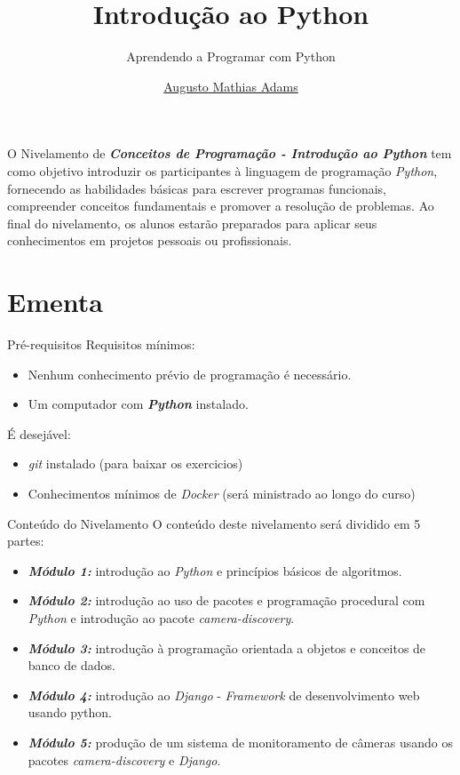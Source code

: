 \documentclass{beamer}
\title{Introdução ao Python}
\subtitle{Aprendendo a Programar com Python}
\author{\href{mailto:augusto.mathias@sesp.pr.gov.br}{Augusto Mathias Adams}}
\begin{document}
\maketitle
{}

\begin{frame}
\label{apresentacao}
O Nivelamento de \textbf{\textit{Conceitos de Programação - Introdução ao Python }}tem como objetivo introduzir os participantes à linguagem de programação \textit{Python}, fornecendo as habilidades básicas para escrever programas funcionais, compreender conceitos fundamentais e promover a resolução de problemas. Ao final do nivelamento, os alunos estarão preparados para aplicar seus conhecimentos em projetos pessoais ou profissionais.

\end{frame}

\section{Ementa}

\begin{frame}{Pré-requisitos}
	\label{conteudo_requisitos}
	Requisitos mínimos:
	\begin{itemize}
		\item Nenhum conhecimento prévio de programação é necessário.
		\item Um computador com \textbf{\textit{Python}} instalado.
	\end{itemize}
	É desejável:
	\begin{itemize}
		\item \textit{git} instalado (para baixar os exercicios)
		\item Conhecimentos mínimos de \textit{Docker} (será ministrado ao longo do curso)
	\end{itemize}
\end{frame}



\begin{frame}{Conteúdo do Nivelamento}
	\label{conteudo_ementa}
	O conteúdo deste nivelamento será dividido em 5 partes:
	\begin{itemize}
		\item \textbf{\textit{Módulo 1: }} introdução ao \textit{Python} e princípios básicos de algoritmos.
		\item \textbf{\textit{Módulo 2: }} introdução ao uso de pacotes e programação procedural com \textit{Python} e introdução ao pacote \textit{camera-discovery}.
		\item \textbf{\textit{Módulo 3: }} introdução à programação orientada a objetos e conceitos de banco de dados.
		\item \textbf{\textit{Módulo 4: }} introdução ao \textit{Django} - \textit{Framework} de desenvolvimento web usando python.
		\item \textbf{\textit{Módulo 5: }} produção de um sistema de monitoramento de câmeras usando os pacotes \textit{camera-discovery} e \textit{Django}.
	\end{itemize}
\end{frame}
\end{document}
